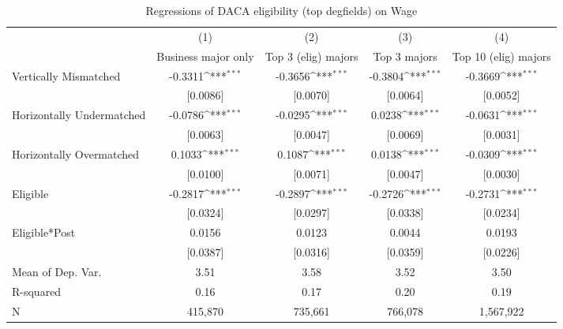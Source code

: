 \begin{table}[htbp]\centering
\def\sym#1{\ifmmode^{#1}\else\(^{#1}\)\fi}
\caption{Regressions of DACA eligibility (top degfields) on Wage}
\begin{tabular}{l*{4}{c}}
\toprule
                    &\multicolumn{1}{c}{(1)}         &\multicolumn{1}{c}{(2)}         &\multicolumn{1}{c}{(3)}         &\multicolumn{1}{c}{(4)}         \\
                    &Business major only         &Top 3 (elig) majors         &Top 3 majors         &Top 10 (elig) majors         \\
\midrule
Vertically Mismatched&     -0.3311\sym{***}&     -0.3656\sym{***}&     -0.3804\sym{***}&     -0.3669\sym{***}\\
                    &    [0.0086]         &    [0.0070]         &    [0.0064]         &    [0.0052]         \\
\addlinespace
Horizontally Undermatched&     -0.0786\sym{***}&     -0.0295\sym{***}&      0.0238\sym{***}&     -0.0631\sym{***}\\
                    &    [0.0063]         &    [0.0047]         &    [0.0069]         &    [0.0031]         \\
\addlinespace
Horizontally Overmatched&      0.1033\sym{***}&      0.1087\sym{***}&      0.0138\sym{***}&     -0.0309\sym{***}\\
                    &    [0.0100]         &    [0.0071]         &    [0.0047]         &    [0.0030]         \\
\addlinespace
Eligible            &     -0.2817\sym{***}&     -0.2897\sym{***}&     -0.2726\sym{***}&     -0.2731\sym{***}\\
                    &    [0.0324]         &    [0.0297]         &    [0.0338]         &    [0.0234]         \\
\addlinespace
Eligible*Post       &      0.0156         &      0.0123         &      0.0044         &      0.0193         \\
                    &    [0.0387]         &    [0.0316]         &    [0.0359]         &    [0.0226]         \\
\midrule
Mean of Dep. Var.   &        3.51         &        3.58         &        3.52         &        3.50         \\
R-squared           &        0.16         &        0.17         &        0.20         &        0.19         \\
N                   &     415,870         &     735,661         &     766,078         &   1,567,922         \\

\end{tabular}
\end{table}
